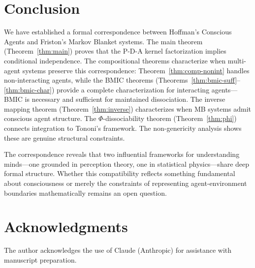 \documentclass[11pt,a4paper]{article}
\begin{document}
\section{Conclusion}

We have established a formal correspondence between Hoffman's Conscious Agents and Friston's Markov Blanket systems. The main theorem (Theorem~\ref{thm:main}) proves that the P-D-A kernel factorization implies conditional independence. The compositional theorems characterize when multi-agent systems preserve this correspondence: Theorem~\ref{thm:comp-nonint} handles non-interacting agents, while the BMIC theorems (Theorems~\ref{thm:bmic-suff}--\ref{thm:bmic-char}) provide a complete characterization for interacting agents---BMIC is necessary and sufficient for maintained dissociation. The inverse mapping theorem (Theorem~\ref{thm:inverse}) characterizes when MB systems admit conscious agent structure. The $\Phi$-dissociability theorem (Theorem~\ref{thm:phi}) connects integration to Tononi's framework. The non-genericity analysis shows these are genuine structural constraints.

The correspondence reveals that two influential frameworks for understanding minds---one grounded in perception theory, one in statistical physics---share deep formal structure. Whether this compatibility reflects something fundamental about consciousness or merely the constraints of representing agent-environment boundaries mathematically remains an open question.

\section*{Acknowledgments}

The author acknowledges the use of Claude (Anthropic) for assistance with manuscript preparation.
\end{document}
